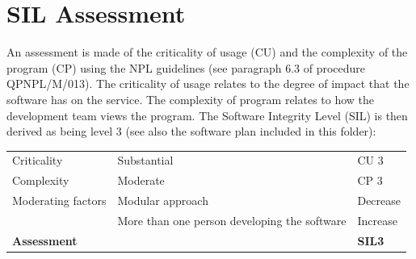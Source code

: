 \section{SIL Assessment}\label{SIL-assessment}
An assessment is made of the criticality of usage (CU) and the complexity of the program (CP) using the NPL guidelines (see paragraph 6.3 of procedure QPNPL/M/013).
The criticality of usage relates to the degree of impact that the software has on the service.
The complexity of program relates to how the development team views the program.
The Software Integrity Level (SIL) is then derived as being level 3 (see also the software plan included in this folder): 

\begin{tabular}{lll}
\toprule
Criticality         & Substantial                                  & CU 3          \\
Complexity          & Moderate 	                                   & CP 3          \\
Moderating factors  & Modular approach                             & Decrease      \\
                    & More than one person developing the software & Increase      \\ \midrule
\textbf{Assessment} &                                              & \textbf{SIL3} \\ \bottomrule
\end{tabular}